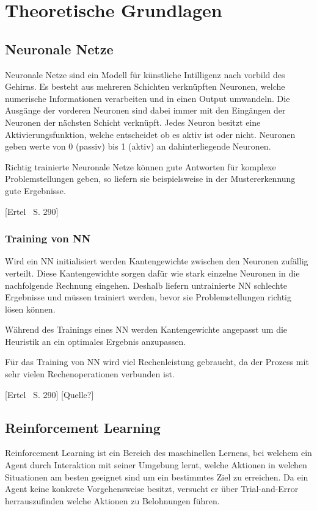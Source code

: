 

\clearpage
\chapter{Theoretische Grundlagen}
\section{Neuronale Netze}
Neuronale Netze sind ein Modell für künstliche Intilligenz nach vorbild des Gehirns.
Es besteht aus mehreren Schichten verknüpften Neuronen, welche numerische Informationen verarbeiten und in einen Output umwandeln. Die Ausgänge der vorderen Neuronen sind dabei immer mit den Eingängen der Neuronen der nächsten Schicht verknüpft.
Jedes Neuron besitzt eine Aktivierungsfunktion, welche entscheidet ob es aktiv ist oder nicht. Neuronen geben werte von 0 (passiv) bis 1 (aktiv) an dahinterliegende Neuronen.

Richtig trainierte Neuronale Netze können gute Antworten für komplexe Problemstellungen geben, so liefern sie beispielsweise in der Mustererkennung gute Ergebnisse.

[Ertel ~S. 290]
\subsection{Training von NN}

Wird ein NN initialisiert werden Kantengewichte zwischen den Neuronen zufällig verteilt. Diese Kantengewichte sorgen dafür wie stark einzelne Neuronen in die nachfolgende Rechnung eingehen.
Deshalb liefern untrainierte NN schlechte Ergebnisse und müssen trainiert werden, bevor sie Problemstellungen richtig lösen können.

Während des Trainings eines NN werden Kantengewichte angepasst um die Heuristik  an ein optimales Ergebnis anzupassen.

Für das Training von NN wird viel Rechenleistung gebraucht, da der Prozess mit sehr vielen Rechenoperationen verbunden ist.

[Ertel ~S. 290]
[Quelle?]
\section{Reinforcement Learning}
Reinforcement Learning ist ein Bereich des maschinellen Lernens, bei welchem ein Agent durch Interaktion mit seiner Umgebung lernt, welche Aktionen in welchen Situationen am besten geeignet sind um ein bestimmtes Ziel zu erreichen.
Da ein Agent keine konkrete Vorgehensweise besitzt, versucht er über Trial-and-Error herrauszufinden welche Aktionen zu Belohnungen führen.

